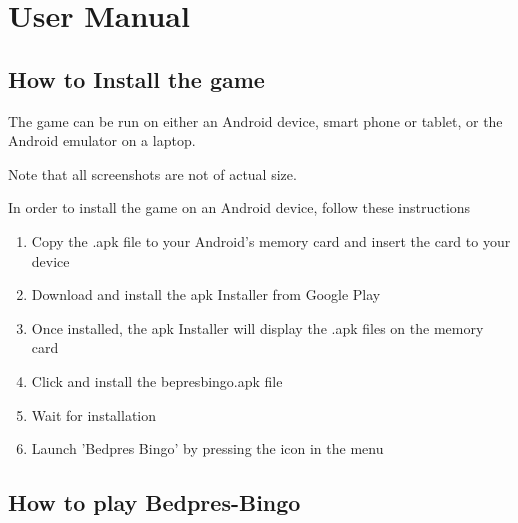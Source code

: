 \section{User Manual}
\label{usermanual}

\subsection{How to Install the game}
The game can be run on either an Android device, smart phone or tablet, or the Android emulator on a laptop. 

Note that all screenshots are not of actual size.

In order to install the game on an Android device, follow these instructions
\begin{enumerate}
\item{Copy the .apk file to your Android's memory card and insert the card to your device}
\item{Download and install the apk Installer from Google Play \cite{https://play.google.com/store/search?q=apps+installer&c=apps&safe=3}}
\item{Once installed, the apk Installer will display the .apk files on the memory card}
\item{Click and install the bepresbingo.apk file}
\item{Wait for installation}
\item{Launch 'Bedpres Bingo' by pressing the icon in the menu}
\end{enumerate}


\subsection{How to play Bedpres-Bingo}

